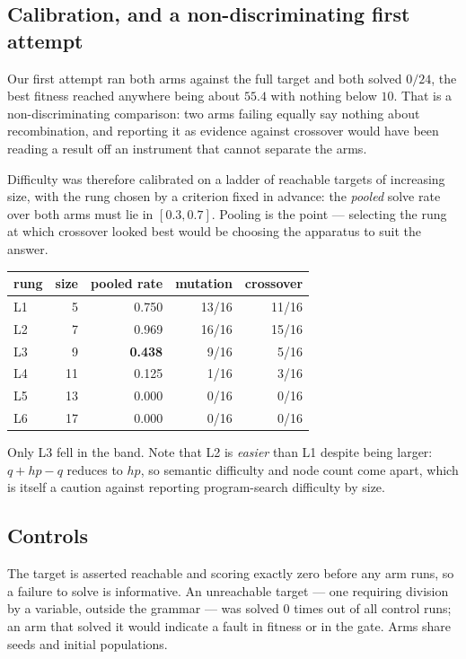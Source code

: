 \documentclass[11pt,a4paper]{article}
\theoremstyle{definition}
\theoremstyle{remark}
\begin{document}
\subsection{Calibration, and a non-discriminating first attempt}

Our first attempt ran both arms against the full target and both solved $0/24$,
the best fitness reached anywhere being about $55.4$ with nothing below $10$.
That is a non-discriminating comparison: two arms failing equally say nothing
about recombination, and reporting it as evidence against crossover would have
been reading a result off an instrument that cannot separate the arms.

Difficulty was therefore calibrated on a ladder of reachable targets of
increasing size, with the rung chosen by a criterion fixed in advance: the
\emph{pooled} solve rate over both arms must lie in $[0.3, 0.7]$. Pooling is the
point --- selecting the rung at which crossover looked best would be choosing
the apparatus to suit the answer.

\begin{center}
\begin{tabular}{lrrrr}
\toprule
rung & size & pooled rate & mutation & crossover \\
\midrule
L1 & 5  & 0.750 & 13/16 & 11/16 \\
L2 & 7  & 0.969 & 16/16 & 15/16 \\
L3 & 9  & \textbf{0.438} & 9/16 & 5/16 \\
L4 & 11 & 0.125 & 1/16 & 3/16 \\
L5 & 13 & 0.000 & 0/16 & 0/16 \\
L6 & 17 & 0.000 & 0/16 & 0/16 \\
\bottomrule
\end{tabular}
\end{center}

Only L3 fell in the band. Note that L2 is \emph{easier} than L1 despite being
larger: $q + hp - q$ reduces to $hp$, so semantic difficulty and node count come
apart, which is itself a caution against reporting program-search difficulty by
size.

\subsection{Controls}

The target is asserted reachable and scoring exactly zero before any arm runs,
so a failure to solve is informative. An unreachable target --- one requiring
division by a variable, outside the grammar --- was solved $0$ times out of all
control runs; an arm that solved it would indicate a fault in fitness or in the
gate. Arms share seeds and initial populations.
\end{document}
